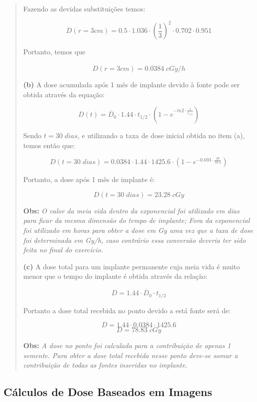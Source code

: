 \documentclass[11pt,a4paper]{article}
\begin{document}
\begin{quote}
					Fazendo as devidas substituições temos:

					$$\dot{D}(r= 3cm) = 0.5 \cdot 1.036 \cdot \left(\frac{1}{3}\right)^2 \cdot 0.702 \cdot 0.951$$

					Portanto, temos que

					$$\dot{D}(r= 3cm) = 0.0384 \; cGy / h$$

				\textbf{(b)} A dose acumulada após 1 mês de implante devido à fonte pode ser obtida através da equação:

					$$D(t) = \dot{D_0} \cdot 1.44 \cdot t_{1/2} \cdot \left(1 - e^{- ln 2 \cdot \frac{t}{t_{1/2}}}\right)$$

					Sendo $t = 30 \; dias$, e utilizando a taxa de dose inicial obtida no item (a), temos então que:

					$$D(t = 30 \; dias) = 0.0384 \cdot 1.44 \cdot 1425.6 \cdot \left(1 - e^{- 0.693 \cdot \frac{30}{59.4}}\right) $$

					Portanto, a dose após 1 mês de implante é:

					$$D(t = 30 \; dias) = 23.28 \; cGy$$

					\textbf{\textcolor{CarnationPink}{Obs:}} \textit{O valor da meia vida dentro da exponencial foi utilizado em dias para ficar da mesma dimensão do tempo de implante; Fora da exponencial foi utilizado em horas para obter a dose em Gy uma vez que a taxa de dose foi determinada em Gy/h, caso contrário essa conversão deveria ter sido feita no final do exercício.}

				\textbf{(c)} A dose total para um implante permanente cuja meia vida é muito menor que o tempo do implante é obtida através da relação:

					$$D = 1.44 \cdot \dot{D_0} \cdot t_{1/2}$$

					Portanto a dose total recebida no ponto devido a está fonte será de:

					$$D = 1.44 \cdot 0.0384 \cdot 1425.6$$
					$$D = 78.83 \; cGy$$

				\textbf{\textcolor{CarnationPink}{Obs:}} \textit{ A dose no ponto foi calculada para a contribuição de apenas 1 semente. Para obter a dose total recebida nesse ponto deve-se somar a contribuição de todas as fontes inseridas no implante.}



			\end{quote}

		\subsection{Cálculos de Dose Baseados em Imagens}
\end{document}
